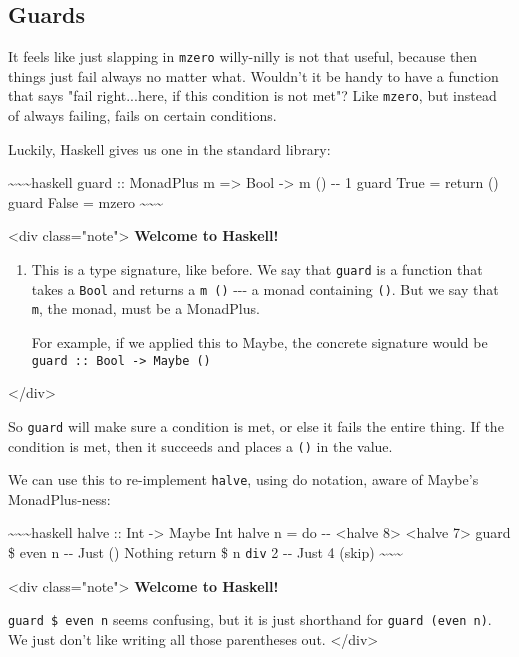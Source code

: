\documentclass[]{article}
\begin{document}
\subsection{Guards}

It feels like just slapping in \texttt{mzero} willy-nilly is not that useful,
because then things just fail always no matter what. Wouldn't it be handy to
have a function that says "fail right...here, if this condition is not met"?
Like \texttt{mzero}, but instead of always failing, fails on certain conditions.

Luckily, Haskell gives us one in the standard library:

\textasciitilde{}\textasciitilde{}\textasciitilde{}haskell guard :: MonadPlus m
=\textgreater{} Bool -\textgreater{} m () -\/- 1 guard True = return () guard
False = mzero \textasciitilde{}\textasciitilde{}\textasciitilde{}

\textless{}div class="note"\textgreater{} \textbf{Welcome to Haskell!}

\begin{enumerate}
\item
  This is a type signature, like before. We say that \texttt{guard} is a
  function that takes a \texttt{Bool} and returns a \texttt{m\ ()} -\/-\/- a
  monad containing \texttt{()}. But we say that \texttt{m}, the monad, must be a
  MonadPlus.

  For example, if we applied this to Maybe, the concrete signature would be
  \texttt{guard\ ::\ Bool\ -\textgreater{}\ Maybe\ ()}
\end{enumerate}

\textless{}/div\textgreater{}

So \texttt{guard} will make sure a condition is met, or else it fails the entire
thing. If the condition is met, then it succeeds and places a \texttt{()} in the
value.

We can use this to re-implement \texttt{halve}, using do notation, aware of
Maybe's MonadPlus-ness:

\textasciitilde{}\textasciitilde{}\textasciitilde{}haskell halve :: Int
-\textgreater{} Maybe Int halve n = do -\/- \textless{}halve 8\textgreater{}
\textless{}halve 7\textgreater{} guard \$ even n -\/- Just () Nothing return \$
n \texttt{div} 2 -\/- Just 4 (skip)
\textasciitilde{}\textasciitilde{}\textasciitilde{}

\textless{}div class="note"\textgreater{} \textbf{Welcome to Haskell!}

\texttt{guard\ \$\ even\ n} seems confusing, but it is just shorthand for
\texttt{guard\ (even\ n)}. We just don't like writing all those parentheses out.
\textless{}/div\textgreater{}
\end{document}
